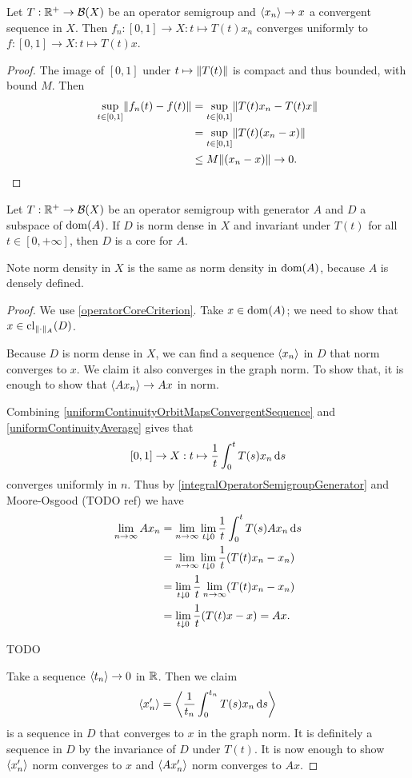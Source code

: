\begin{lemma} \label{uniformContinuityOrbitMapsConvergentSequence}
Let $T: \mathbb{R}^+\to \operatorname{\mathcal{B}}(X)$ be an operator semigroup and $\left\langle x_n \right\rangle \to x$ a convergent sequence in $X$. Then $f_n: [0,1]\to X: t\mapsto T(t)x_n$ converges uniformly to $f: [0,1]\to X: t\mapsto T(t)x$.
\end{lemma}
\begin{proof}
The image of $[0,1]$ under $t\mapsto \lVert T(t)\rVert$ is compact and thus bounded, with bound $M$. Then
\begin{align*}
\sup_{t\in [0,1]}\lVert f_n(t) - f(t)\rVert &= \sup_{t\in [0,1]}\lVert T(t)x_n - T(t)x\rVert \\
&= \sup_{t\in [0,1]}\lVert T(t)(x_n - x)\rVert \\
&\leq M\lVert(x_n - x)\rVert \to 0.
\end{align*}
\end{proof}

\begin{proposition} \label{coreGeneratorCriterion}
Let $T: \mathbb{R}^+\to \operatorname{\mathcal{B}}(X)$ be an operator semigroup with generator $A$ and $D$ a subspace of $\operatorname{dom}(A)$. If $D$ is norm dense in $X$ and invariant under $T(t)$ for all $t\in [0,+\infty]$, then $D$ is a core for $A$.
\end{proposition}
Note norm density in $X$ is the same as norm density in $\operatorname{dom}(A)$, because $A$ is densely defined.
\begin{proof}
We use \ref{operatorCoreCriterion}. Take $x\in \operatorname{dom}(A)$; we need to show that $x\in\operatorname{cl}_{\lVert\cdot\rVert_A}(D)$.

Because $D$ is norm dense in $X$, we can find a sequence $\left\langle x_n \right\rangle$ in $D$ that norm converges to $x$. We claim it also converges in the graph norm. To show that, it is enough to show that $\left\langle Ax_n \right\rangle \to Ax$ in norm.

Combining \ref{uniformContinuityOrbitMapsConvergentSequence} and \ref{uniformContinuityAverage} gives that
\[ [0,1] \to X: t\mapsto \frac{1}{t}\int_0^t T(s)x_n\operatorname{d \!}{s} \]
converges uniformly in $n$. Thus by \ref{integralOperatorSemigroupGenerator} and Moore-Osgood (TODO ref) we have
\begin{align*}
\lim_{n\to \infty} Ax_n &= \lim_{n\to \infty} \lim_{t\downarrow 0}\frac{1}{t}\int_0^t T(s)Ax_n \operatorname{d \!}{s} \\
&= \lim_{n\to \infty} \lim_{t\downarrow 0}\frac{1}{t}(T(t)x_n - x_n) \\
&= \lim_{t\downarrow 0}\frac{1}{t}\lim_{n\to \infty}(T(t)x_n - x_n) \\
&= \lim_{t\downarrow 0}\frac{1}{t}(T(t)x - x) = Ax.
\end{align*}

TODO

Take a sequence $\left\langle t_n \right\rangle\to 0$ in $\mathbb{R}$. Then we claim
\[ \left\langle x'_n \right\rangle = \left\langle \frac{1}{t_n}\int_0^{t_n}T(s)x_n\operatorname{d \!}{s} \right\rangle \]
is a sequence in $D$ that converges to $x$ in the graph norm. It is definitely a sequence in $D$ by the invariance of $D$ under $T(t)$. It is now enough to show $\left\langle x'_n \right\rangle$ norm converges to $x$ and $\left\langle Ax'_n \right\rangle$ norm converges to $Ax$.
\end{proof}

